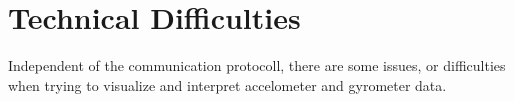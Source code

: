 \section{Technical Difficulties}

Independent of the communication protocoll, there are some issues, or difficulties when trying to visualize and interpret accelometer and gyrometer data. 